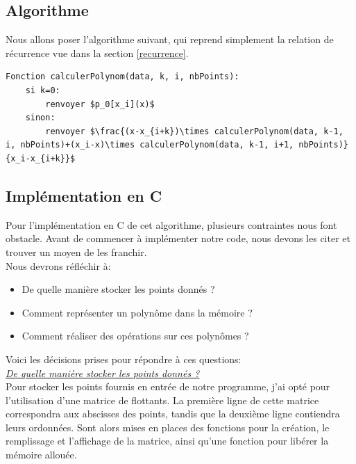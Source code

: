 \documentclass{report}
\begin{document}
\subsection{Algorithme}
Nous allons poser l'algorithme suivant, qui reprend simplement la relation de récurrence vue dans la section \ref{recurrence}.
\begin{lstlisting}[mathescape=true, frame=single, basicstyle=\linespread{1.5}\fontsize{8}{10}\selectfont]
Fonction calculerPolynom(data, k, i, nbPoints):
    si k=0:
        renvoyer $p_0[x_i](x)$
    sinon:
        renvoyer $\frac{(x-x_{i+k})\times calculerPolynom(data, k-1, i, nbPoints)+(x_i-x)\times calculerPolynom(data, k-1, i+1, nbPoints)}{x_i-x_{i+k}}$
\end{lstlisting}
\subsection{Implémentation en C}
Pour l'implémentation en C de cet algorithme, plusieurs contraintes nous font obstacle. Avant de commencer à implémenter notre code, nous devons les citer et trouver un moyen de les franchir.\vspace{6pt}\\
Nous devrons réfléchir à:
\begin{itemize}
    \item De quelle manière stocker les points donnés ?
    \item Comment représenter un polynôme dans la mémoire ?
    \item Comment réaliser des opérations sur ces polynômes ?\vspace{4pt}\\
\end{itemize}
\label{header}
Voici les décisions prises pour répondre à ces questions:\vspace{4pt}\\
\underline{\textit{De quelle manière stocker les points donnés ?}}\vspace{4pt}\\
Pour stocker les points fournis en entrée de notre programme, j'ai opté pour l'utilisation d'une matrice de flottants. La première ligne de cette matrice correspondra aux abscisses des points, tandis que la deuxième ligne contiendra leurs ordonnées. Sont alors mises en places des fonctions pour la création, le remplissage et l'affichage de la matrice, ainsi qu'une fonction pour libérer la mémoire allouée.\vspace{6pt}\\
\end{document}
